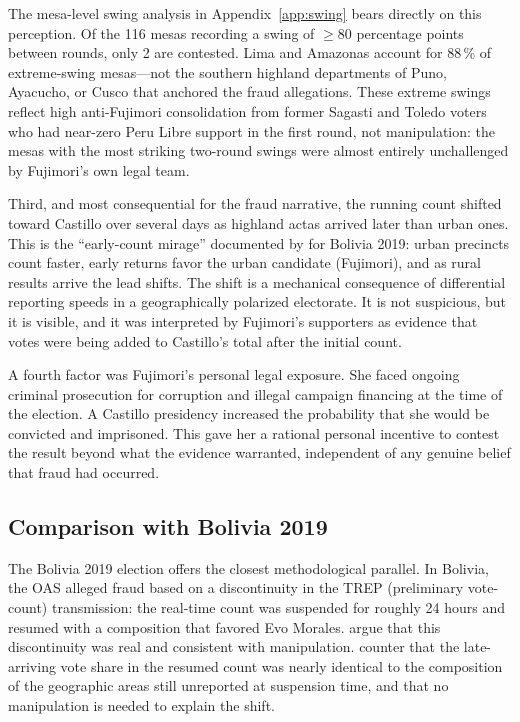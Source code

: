 \documentclass[12pt]{article}
\begin{document}
The mesa-level swing analysis in Appendix~\ref{app:swing} bears directly
on this perception.
Of the 116 mesas recording a swing of $\geq 80$ percentage points
between rounds, only 2 are contested.
Lima and Amazonas account for 88\,\% of extreme-swing mesas---not the
southern highland departments of Puno, Ayacucho, or Cusco that anchored
the fraud allegations.
These extreme swings reflect high anti-Fujimori consolidation from former
Sagasti and Toledo voters who had near-zero Peru Libre support in the first
round, not manipulation: the mesas with the most striking two-round swings
were almost entirely unchallenged by Fujimori's own legal team.

Third, and most consequential for the fraud narrative, the running count
shifted toward Castillo over several days as highland actas arrived later
than urban ones. This is the ``early-count mirage'' documented by
\citet{idrobo2022} for Bolivia 2019: urban precincts count faster, early
returns favor the urban candidate (Fujimori), and as rural results arrive
the lead shifts. The shift is a mechanical consequence of differential
reporting speeds in a geographically polarized electorate. It is not
suspicious, but it is visible, and it was interpreted by Fujimori's supporters
as evidence that votes were being added to Castillo's total after the
initial count.

A fourth factor was Fujimori's personal legal exposure. She faced ongoing
criminal prosecution for corruption and illegal campaign financing at the
time of the election. A Castillo presidency increased the probability that
she would be convicted and imprisoned.
This gave her a rational personal incentive to contest the result beyond
what the evidence warranted, independent of any genuine belief that fraud
had occurred.

\subsection{Comparison with Bolivia 2019}

The Bolivia 2019 election offers the closest methodological parallel.
In Bolivia, the OAS alleged fraud based on a discontinuity in the TREP
(preliminary vote-count) transmission: the real-time count was suspended for
roughly 24 hours and resumed with a composition that favored Evo Morales.
\citet{escobari2024} argue that this discontinuity was real and consistent with
manipulation. \citet{idrobo2022} counter that the late-arriving vote share in
the resumed count was nearly identical to the composition of the geographic
areas still unreported at suspension time, and that no manipulation is needed
to explain the shift.
\end{document}

